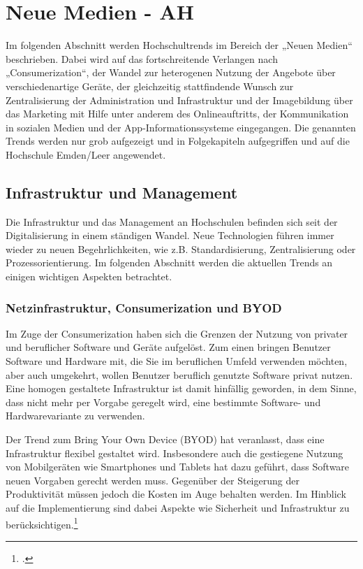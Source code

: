\clearpage
\section{Neue Medien - AH}

Im folgenden Abschnitt werden Hochschultrends im Bereich der „Neuen Medien“ beschrieben. Dabei wird auf das fortschreitende Verlangen nach „Consumerization“, der Wandel zur heterogenen Nutzung der Angebote über verschiedenartige Geräte, der gleichzeitig stattfindende Wunsch zur Zentralisierung der Administration und Infrastruktur und der Imagebildung über das Marketing mit Hilfe unter anderem des Onlineauftritts, der Kommunikation in sozialen Medien und der App-Informationssysteme eingegangen. Die genannten Trends werden nur grob aufgezeigt und in Folgekapiteln aufgegriffen und auf die Hochschule Emden/Leer angewendet.


\subsection{Infrastruktur und Management}
Die Infrastruktur und das Management an Hochschulen befinden sich seit der Digitalisierung in einem ständigen Wandel. Neue Technologien führen immer wieder zu neuen Begehrlichkeiten, wie z.B. Standardisierung, Zentralisierung oder Prozessorientierung. Im folgenden Abschnitt werden die aktuellen Trends an einigen wichtigen Aspekten betrachtet.


\subsubsection{Netzinfrastruktur, Consumerization und BYOD}
\label{netzinfrastruktur_consumerization_und_byod}
Im Zuge der Consumerization haben sich die Grenzen der Nutzung von privater und beruflicher Software und Geräte aufgelöst. Zum einen bringen Benutzer Software und Hardware mit, die Sie im beruflichen Umfeld verwenden möchten, aber auch umgekehrt, wollen Benutzer beruflich genutzte Software privat nutzen. Eine homogen gestaltete Infrastruktur ist damit hinfällig geworden, in dem Sinne, dass nicht mehr per Vorgabe geregelt wird, eine bestimmte Software- und Hardwarevariante zu verwenden.

Der Trend zum Bring Your Own Device (BYOD) hat veranlasst, dass eine Infrastruktur flexibel 
gestaltet wird. Insbesondere auch die gestiegene Nutzung von Mobilgeräten wie Smartphones 
und Tablets hat dazu geführt, dass Software neuen Vorgaben gerecht werden muss. Gegenüber 
der Steigerung der Produktivität müssen jedoch die Kosten im Auge behalten werden. Im 
Hinblick auf die Implementierung sind dabei Aspekte wie Sicherheit und Infrastruktur zu 
berücksichtigen.\footcite{forrester_research_2012}

